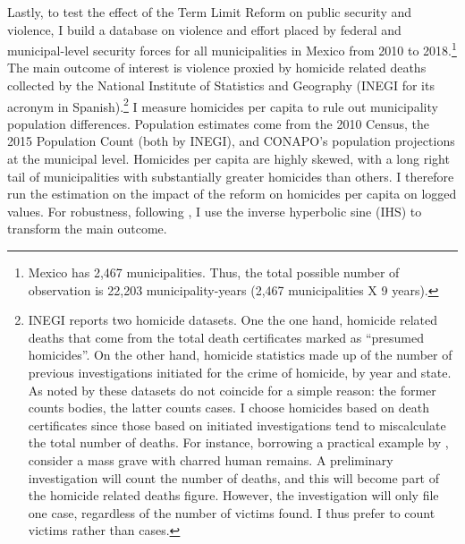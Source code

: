 \documentclass[12pt]{amsart}
\numberwithin{equation}{section}
\theoremstyle{definition}
\theoremstyle{definition}
\theoremstyle{definition}
\begin{document}
Lastly, to test the effect of the Term Limit Reform on public security and violence, I build a database on violence and effort placed by federal and municipal-level security forces for all municipalities in Mexico from 2010 to 2018.\footnote{Mexico has 2,467 municipalities. Thus, the total possible number of observation is 22,203 municipality-years (2,467 municipalities X 9 years).} The main outcome of interest is violence proxied by homicide related deaths collected by the National Institute of Statistics and Geography (INEGI for its acronym in Spanish).\footnote{INEGI reports two homicide datasets. One the one hand, homicide related deaths that come from the total death certificates marked as ``presumed homicides''. On the other hand, homicide statistics made up of the number of previous investigations initiated for the crime of homicide, by year and state. As noted by \citet{rivera_2012} these datasets do not coincide for a simple reason: the former counts bodies, the latter counts cases. I choose homicides based on death certificates since those based on initiated investigations tend to miscalculate the total number of deaths. For instance, borrowing a practical example by \citet{rivera_2012}, consider a mass grave with charred human remains. A preliminary investigation will count the number of deaths, and this will become part of the homicide related deaths figure. However, the investigation will only file one case, regardless of the number of victims found. I thus prefer to count victims rather than cases.} I measure homicides per capita to rule out municipality population differences. Population estimates come from the 2010 Census, the 2015 Population Count (both by INEGI), and CONAPO's population projections at the municipal level. Homicides per capita are highly skewed, with a long right tail of municipalities with substantially greater homicides than others. I therefore run the estimation on the impact of the reform on homicides per capita on logged values. For robustness, following \citet{mackinnon_maggie_1990}, I use the inverse hyperbolic sine (IHS) to transform the main outcome. %
\end{document}
